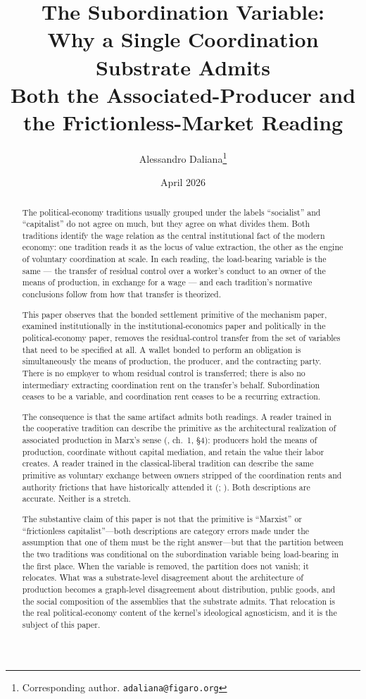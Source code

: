 \documentclass[11pt,a4paper]{article}
\title{%
  The Subordination Variable:\\
  Why a Single Coordination Substrate Admits\\
  Both the Associated-Producer and the Frictionless-Market Reading%
}
\author{
  Alessandro Daliana\thanks{Corresponding author. \texttt{adaliana@figaro.org}}
}
\date{April 2026}
\theoremstyle{remark}
\begin{document}
\maketitle

\begin{abstract}
The political-economy traditions usually grouped under the labels
``socialist'' and ``capitalist'' do not agree on much, but they
agree on what divides them. Both traditions identify the wage
relation as the central institutional fact of the modern economy:
one tradition reads it as the locus of value extraction, the other
as the engine of voluntary coordination at scale. In each reading,
the load-bearing variable is the same --- the transfer of residual
control over a worker's conduct to an owner of the means of
production, in exchange for a wage --- and each tradition's
normative conclusions follow from how that transfer is theorized.

This paper observes that the bonded settlement primitive of
the mechanism paper, examined institutionally
in the institutional-economics paper and politically
in the political-economy paper, removes the residual-control
transfer from the set of variables that need to be specified at all.
A wallet bonded to perform an obligation is simultaneously the means
of production, the producer, and the contracting party. There is no
employer to whom residual control is transferred; there is also no
intermediary extracting coordination rent on the transfer's behalf.
Subordination ceases to be a variable, and coordination rent ceases
to be a recurring extraction.

The consequence is that the same artifact admits both readings. A
reader trained in the cooperative tradition can describe the
primitive as the architectural realization of associated production
in Marx's sense (\citealt{marx1867capital}, ch.~1, §4): producers
hold the means of production, coordinate without capital mediation,
and retain the value their labor creates. A reader trained in the
classical-liberal tradition can describe the same primitive as
voluntary exchange between owners stripped of the coordination
rents and authority frictions that have historically attended it
(\citealt{hayek1945knowledge}; \citealt{friedman1962capitalism}).
Both descriptions are accurate. Neither is a stretch.

The substantive claim of this paper is not that the primitive is
``Marxist'' or ``frictionless capitalist''---both descriptions are
category errors made under the assumption that one of them must be
the right answer---but that the partition between the two
traditions was conditional on the subordination variable being
load-bearing in the first place. When the variable is removed,
the partition does not vanish; it relocates. What was a
substrate-level disagreement about the architecture of production
becomes a graph-level disagreement about distribution, public
goods, and the social composition of the assemblies that the
substrate admits. That relocation is the real political-economy
content of the kernel's ideological agnosticism, and it is the
subject of this paper.
\end{abstract}
\end{document}
